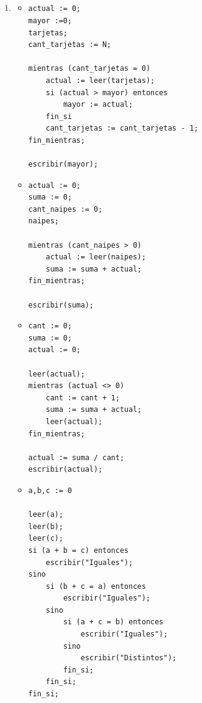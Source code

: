 \documentclass[a4paper,10pt]{article}
\begin{document}
~\\ \\ \\ \\
\begin{enumerate}

\item[2]
    \begin{itemize}
        \item[3-b]
            \begin{small}
\begin{verbatim}
actual := 0;
mayor :=0;
tarjetas;
cant_tarjetas := N;

mientras (cant_tarjetas = 0)
    actual := leer(tarjetas);
    si (actual > mayor) entonces
        mayor := actual;
    fin_si
    cant_tarjetas := cant_tarjetas - 1;
fin_mientras;

escribir(mayor);                
\end{verbatim}
            \end{small}
        \item[4-b]
            \begin{small}
\begin{verbatim}
actual := 0;
suma := 0;
cant_naipes := 0;
naipes;

mientras (cant_naipes > 0) 
    actual := leer(naipes);
    suma := suma + actual;
fin_mientras;

escribir(suma);
\end{verbatim}
            \end{small}        
        \item[6]
            \begin{small}
\begin{verbatim}
cant := 0;
suma := 0;
actual := 0;

leer(actual);
mientras (actual <> 0)
    cant := cant + 1;
    suma := suma + actual;
    leer(actual);
fin_mientras;

actual := suma / cant;
escribir(actual);
\end{verbatim}
            \end{small}        
        \item[9]
            \begin{small}
\begin{verbatim}
a,b,c := 0

leer(a);
leer(b);
leer(c);
si (a + b = c) entonces
    escribir("Iguales");
sino
    si (b + c = a) entonces
        escribir("Iguales");
    sino
        si (a + c = b) entonces
            escribir("Iguales");
        sino
            escribir("Distintos");
        fin_si;
    fin_si;
fin_si;
\end{verbatim}
            \end{small}        
    \end{itemize}
    

\end{enumerate}
\end{document}
